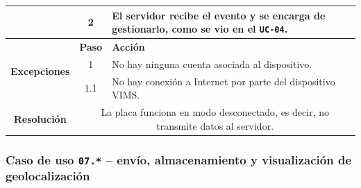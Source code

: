 \begin{table}[H]
\begin{tabularx}{\textwidth}{|c|c|X|}
    \cline{2-3}
                                                & 2                                                                                                                                                 & \multicolumn{1}{L|}{El servidor recibe el evento y se encarga de gestionarlo, como se vio en el \texttt{UC-04}.}                                                        \\
    \hline
    \multirow{3}{*}{\textbf{Excepciones}}       & \textbf{Paso}                                                                                                                                     & \textbf{Acción}                                                                                                                                                         \\
    \cline{2-3}
                                                & 1                                                                                                                                                 & \multicolumn{1}{L|}{No hay ninguna cuenta asociada al dispositivo.}                                                                                                     \\
    \cline{2-3}
                                                & 1.1                                                                                                                                               & \multicolumn{1}{L|}{No hay conexión a Internet por parte del dispositivo \ac{VIMS}.}                                                                                    \\
    \hline\hline
    \textbf{Resolución}                         & \multicolumn{2}{X|}{La placa funciona en modo desconectado, es decir, no transmite datos al servidor.}                                                                                                                                                                                                                      \\
    \hline
  \end{tabularx}
\end{table}

\subsubsection{Caso de uso \texttt{07.*} -- envío, almacenamiento y visualización de geolocalización}

